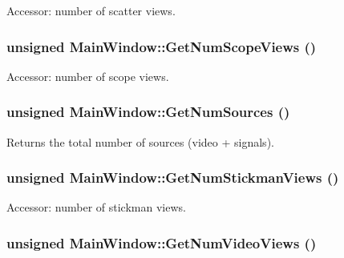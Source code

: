 Accessor: number of scatter views. 

\hypertarget{class_main_window_e66063bfcc69ac8b8417d2cae19a14da}{
\subsubsection[{GetNumScopeViews}]{\setlength{\rightskip}{0pt plus 5cm}unsigned MainWindow::GetNumScopeViews ()}}
\label{class_main_window_e66063bfcc69ac8b8417d2cae19a14da}


Accessor: number of scope views. 

\hypertarget{class_main_window_dafc0a3e5912b3edf5da3ca827d47d16}{
\subsubsection[{GetNumSources}]{\setlength{\rightskip}{0pt plus 5cm}unsigned MainWindow::GetNumSources ()}}
\label{class_main_window_dafc0a3e5912b3edf5da3ca827d47d16}


Returns the total number of sources (video + signals). 

\hypertarget{class_main_window_35bf36017389eb376f4628a50b472bc2}{
\subsubsection[{GetNumStickmanViews}]{\setlength{\rightskip}{0pt plus 5cm}unsigned MainWindow::GetNumStickmanViews ()}}
\label{class_main_window_35bf36017389eb376f4628a50b472bc2}


Accessor: number of stickman views. 

\hypertarget{class_main_window_6339a32c7cb1668e33a4271d7457c467}{
\subsubsection[{GetNumVideoViews}]{\setlength{\rightskip}{0pt plus 5cm}unsigned MainWindow::GetNumVideoViews ()}}
\label{class_main_window_6339a32c7cb1668e33a4271d7457c467}


